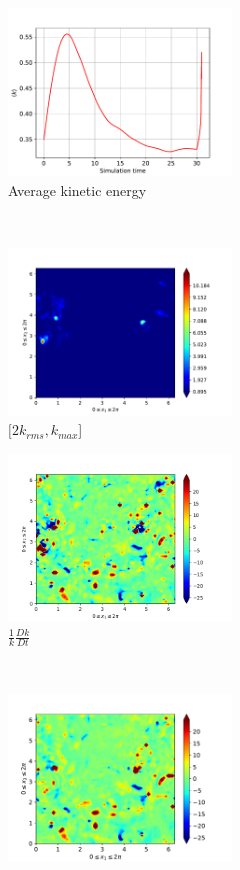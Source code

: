\begin{figure}[H]
    \begin{subfigure}[H]{0.45\textwidth}
        \includegraphics[height=1.75in]{media/run-cds-65/ke-average1460}
        \caption{Average kinetic energy}
    \end{subfigure}
    ~
    \begin{subfigure}[H]{0.45\textwidth}
        \includegraphics[height=1.75in]{media/run-cds-65/ke-2-1460}
        \caption{$[2k_{rms}, k_{max} $] }
    \end{subfigure}
    \newline
    \begin{subfigure}[H]{0.45\textwidth}
        \includegraphics[height=1.75in]{media/run-cds-65/ke-1460}
        \caption{$\frac{1}{k} \frac{D k}{Dt}$}
    \end{subfigure}
    ~
    \begin{subfigure}{0.45\textwidth}
        \includegraphics[height=1.75in]{media/run-cds-65/A-ke-1460}

\end{subfigure}
\end{figure}
